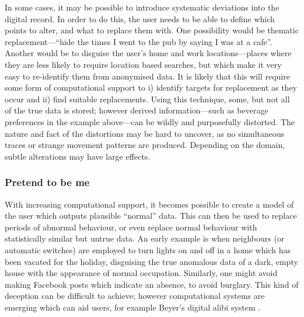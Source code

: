 \documentclass{IOS-Book-Article}     %
\newcommand{\tbox}[3][red]{{
\color{#1}\noindent{
   \fbox{\scriptsize{ {\bf #2} \textsl{#3}}}
   \vspace{2pt}
}
}}
\newcommand{\todo}[1]{\tbox{TODO:}{#1}}
\begin{document}
In some cases, it may be possible to introduce systematic deviations into the
digital record. In order to do this, the user needs to be able to define which
points to alter, and what to replace them with. One possibility would be
thematic replacement---``hide the times I went to the pub by saying I
was at a cafe''. Another would be to disguise the user's home and work
locations---places where they are less likely to require location based
searches, but which make it very easy to re-identify them from anonymised data.
It is likely that this will require some form of computational support to i) identify targets for replacement as they occur and ii) find suitable replacements. Using this technique, some, but not all of the true data is stored; however derived information---such as beverage preferences in the
example above---can be wildly and purposefully distorted. The nature and fact of
the distortions may be hard to uncover, as no simultaneous traces or
strange movement patterns are produced. Depending on the domain, subtle
alterations may have large effects.

\subsubsection{Pretend to be me}

With increasing computational support, it becomes possible to create a model of
the user which outputs plausible ``normal'' data. This can then be used to
replace periods of abnormal behaviour, or even replace normal behaviour with
statistically similar but untrue data. An early example is when neighbours (or
automatic switches) are employed to turn lights on and off in a home which has
been vacated for the holiday, disguising the true anomalous data of a dark,
empty house with the appearance of normal occupation. Similarly, one might avoid
making Facebook posts which indicate an absence, to avoid burglary. This kind of
deception can be difficult to achieve; however computational systems are
emerging which can aid users, for example Beyer's digital alibi system
\cite{beyer2014Alibi}.
\end{document}
